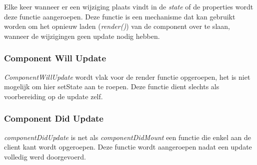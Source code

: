 		Elke keer wanneer er een wijziging plaats vindt in de \emph{state} of de properties wordt deze functie aangeroepen. Deze functie is een mechanisme dat kan gebruikt worden om het opnieuw laden (\emph{render()}) van de component over te slaan, wanneer de wijzigingen geen update nodig hebben.
	
	\subsubsection{Component Will Update}
		
		\emph{ComponentWillUpdate} wordt vlak voor de render functie opgeroepen, het is niet mogelijk om hier setState aan te roepen. Deze functie dient slechts als voorbereiding op de update zelf.
	
	\subsubsection{Component Did Update}
		
		\emph{componentDidUpdate} is net als \emph{componentDidMount} een functie die enkel aan de client kant wordt opgeroepen. Deze functie wordt aangeroepen nadat een update volledig werd doorgevoerd.
		
